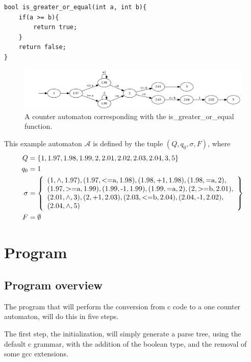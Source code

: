 \documentclass[12pt]{article}
\begin{document}
\begin{lstlisting}[style=CStyle]
bool is_greater_or_equal(int a, int b){
	if(a >= b){
		return true;
	}
	return false;
}
\end{lstlisting}

\begin{figure}[h]
	\includegraphics[width=\linewidth]{is_greater_or_equal_counter_automaton}
	\caption{A counter automaton corresponding with the is\_greater\_or\_equal function.}
	\label{fig:greater_or_equal}
\end{figure}

This example automaton $\mathcal{A}$ is defined by the tuple $(Q, q_0, \sigma, F)$, where
\begin{align*}
	Q &= \{1, 1.97, 1.98, 1.99, 2, 2.01, 2.02, 2.03, 2.04, 3, 5\} \\
	q_0 &= 1 \\
	\sigma &= \left\{ \begin{array}{l}
		(1, \wedge, 1.97), (1.97, \text{\textless =a}, 1.98), (1.98, \text{+1}, 1.98), (1.98, \text{=a}, 2), \\
		(1.97, \text{\textgreater =a}, 1.99), (1.99, \text{-1}, 1.99), (1.99, \text{=a}, 2), (2, \text{\textgreater =b}, 2.01),\\ (2.01, \wedge, 3), (2, \text{+1}, 2.03), (2.03, \text{\textless =b}, 2.04), (2.04, \text{-1}, 2.02),\\ (2.04, \wedge, 5)
	\end{array} \right\}\\
	F &= \emptyset
\end{align*}

\section{Program}
\subsection{Program overview}
The program that will perform the conversion from c code to a one counter automaton, will do this in five steps.

The first step, the initialization, will simply generate a parse tree, using the default c grammar, with the addition of the boolean type, and the removal of some gcc extensions.
\end{document}
